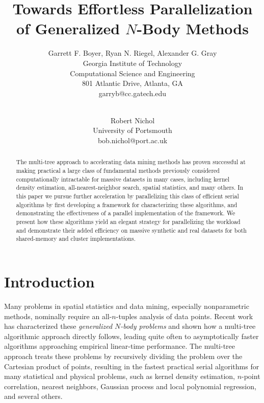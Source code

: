\documentclass[times, leqno,twocolumn]{article}
\begin{document}
\title{Towards Effortless Parallelization of Generalized $N$-Body Methods}

\author{Garrett F. Boyer, Ryan N. Riegel, Alexander G. Gray
\\ Georgia Institute of Technology
\\ Computational Science and Engineering
\\ 801 Atlantic Drive, Atlanta, GA
\\ garryb@cc.gatech.edu
\\
\and
\\ Robert Nichol
\\ University of Portsmouth
\\ bob.nichol@port.ac.uk
}

\maketitle
\thispagestyle{empty}

\begin{abstract}
The multi-tree approach to accelerating data mining methods has proven successful at making practical a large class of fundamental methods previously considered computationally intractable for massive datasets in many cases, including kernel density estimation, all-nearest-neighbor search, spatial statistics, and many others.
In this paper we pursue further acceleration by parallelizing this class of efficient serial algorithms by first developing a framework for characterizing these algorithms, and demonstrating the effectiveness of a parallel implementation of the framework.
We present how these algorithms yield an elegant strategy for parallelizing the workload and demonstrate their added efficiency on massive synthetic and real datasets for both shared-memory and cluster implementations.
\end{abstract}

\section{Introduction}

Many problems in spatial statistics and data mining, especially nonparametric methods, nominally require an all-$n$-tuples analysis of data points.
Recent work\cite{ryan_nips} has characterized these {\it generalized $N$-body problems} and shown how a multi-tree algorithmic approach directly follows, leading quite often to asymptotically faster algorithms approaching empirical linear-time performance.
The multi-tree approach treats these problems by recursively dividing the problem over the Cartesian product of points, resulting in the fastest practical serial algorithms for many statistical and physical problems, such as kernel density estimation, $n$-point correlation, nearest neighbors, Gaussian process and local polynomial regression, and several others.
\end{document}

